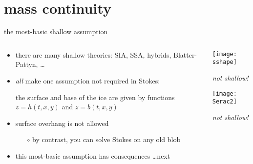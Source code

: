 
\section{mass continuity}

\begin{frame}{the most-basic shallow assumption}

\begin{columns}

\begin{column}{0.6\textwidth}
\begin{itemize}
\item there are many shallow theories: SIA, SSA, hybrids, Blatter-Pattyn, \dots
\item \emph{all} make one assumption not required in Stokes:

\begin{center}
\alert{the surface and base of the ice are given by functions $z=h(t,x,y)$ and $z=b(t,x,y)$}
\end{center}
\item surface overhang is not allowed
  \begin{itemize}
  \item[$\circ$] by contrast, you can solve Stokes on any old blob
  \end{itemize}
\item this most-basic assumption has consequences \dots next
\end{itemize}
\end{column}

\begin{column}{0.4\textwidth}
\texttt{[image: sshape]}

\scriptsize
\begin{center}
\emph{not shallow!}
\end{center}
\vspace{6mm}

\texttt{[image: Serac2]}

\begin{center}
\emph{not shallow!}
\end{center}
\end{column}
\end{columns}
\end{frame}


